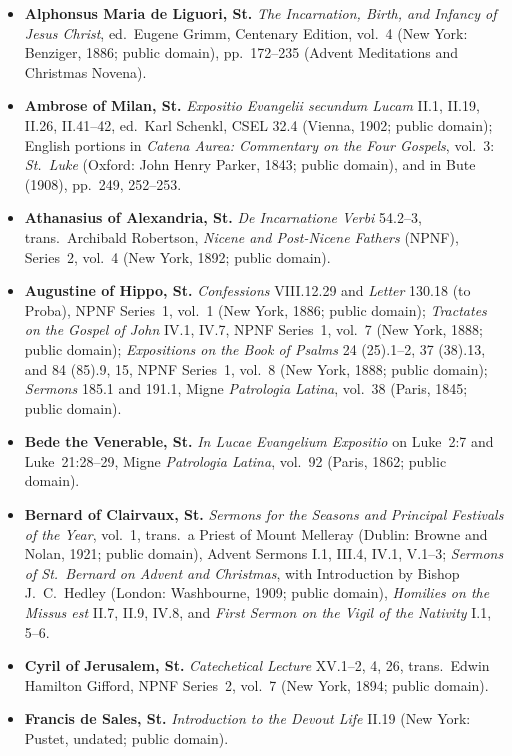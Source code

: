 \begin{itemize}
\item \textbf{Alphonsus Maria de Liguori, St.} \textit{The Incarnation, Birth, and Infancy of Jesus Christ}, ed.~Eugene Grimm, Centenary Edition, vol.~4 (New York: Benziger, 1886; public domain), pp.~172--235 (Advent Meditations and Christmas Novena).
\item \textbf{Ambrose of Milan, St.} \textit{Expositio Evangelii secundum Lucam} II.1, II.19, II.26, II.41--42, ed.~Karl Schenkl, CSEL 32.4 (Vienna, 1902; public domain); English portions in \textit{Catena Aurea: Commentary on the Four Gospels}, vol.~3: \textit{St.~Luke} (Oxford: John Henry Parker, 1843; public domain), and in Bute (1908), pp.~249, 252--253.
\item \textbf{Athanasius of Alexandria, St.} \textit{De Incarnatione Verbi} 54.2--3, trans.~Archibald Robertson, \textit{Nicene and Post-Nicene Fathers} (NPNF), Series~2, vol.~4 (New York, 1892; public domain).
\item \textbf{Augustine of Hippo, St.} \textit{Confessions} VIII.12.29 and \textit{Letter} 130.18 (to Proba), NPNF Series~1, vol.~1 (New York, 1886; public domain); \textit{Tractates on the Gospel of John} IV.1, IV.7, NPNF Series~1, vol.~7 (New York, 1888; public domain); \textit{Expositions on the Book of Psalms} 24 (25).1--2, 37 (38).13, and 84 (85).9, 15, NPNF Series~1, vol.~8 (New York, 1888; public domain); \textit{Sermons} 185.1 and 191.1, Migne \textit{Patrologia Latina}, vol.~38 (Paris, 1845; public domain).
\item \textbf{Bede the Venerable, St.} \textit{In Lucae Evangelium Expositio} on Luke~2:7 and Luke~21:28--29, Migne \textit{Patrologia Latina}, vol.~92 (Paris, 1862; public domain).
\item \textbf{Bernard of Clairvaux, St.} \textit{Sermons for the Seasons and Principal Festivals of the Year}, vol.~1, trans.~a Priest of Mount Melleray (Dublin: Browne and Nolan, 1921; public domain), Advent Sermons I.1, III.4, IV.1, V.1--3; \textit{Sermons of St.~Bernard on Advent and Christmas}, with Introduction by Bishop J.~C.~Hedley (London: Washbourne, 1909; public domain), \textit{Homilies on the Missus est} II.7, II.9, IV.8, and \textit{First Sermon on the Vigil of the Nativity} I.1, 5--6.
\item \textbf{Cyril of Jerusalem, St.} \textit{Catechetical Lecture} XV.1--2, 4, 26, trans.~Edwin Hamilton Gifford, NPNF Series~2, vol.~7 (New York, 1894; public domain).
\item \textbf{Francis de Sales, St.} \textit{Introduction to the Devout Life} II.19 (New York: Pustet, undated; public domain).

\end{itemize}
